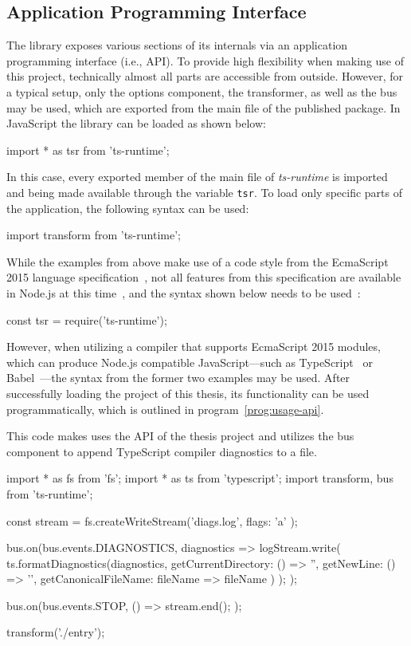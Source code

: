\subsection{Application Programming Interface}
\label{sec:usage-api}

The library exposes various sections of its internals via an application programming interface (i.e., API). To provide high flexibility when making use of this project, technically almost all parts are accessible from outside. However, for a typical setup, only the options component, the transformer, as well as the bus may be used, which are exported from the main file of the published package. In JavaScript the library can be loaded as shown below:
\begin{JsCode}[numbers=none]
import * as tsr from 'ts-runtime';
\end{JsCode}
In this case, every exported member of the main file of \emph{ts-runtime} is imported and being made available through the variable \texttt{tsr}. To load only specific parts of the application, the following syntax can be used:
\begin{JsCode}[numbers=none]
import { transform } from 'ts-runtime';
\end{JsCode}
While the examples from above make use of a code style from the EcmaScript 2015 language specification~\cite[p.~302]{ES6Spec:Ecma:2015}, not all features from this specification are available in Node.js at this time~\cite{Node:Docs:ES6}, and the syntax shown below needs to be used~\cite{Node:API:Modules}:
\begin{JsCode}[numbers=none]
const tsr = require('ts-runtime');
\end{JsCode}
However, when utilizing a compiler that supports EcmaScript 2015 modules, which can produce Node.js compatible JavaScript---such as TypeScript~\cite{TypeScriptHandbook:Modules} or Babel~\cite{Babel:Plugins}---the syntax from the former two examples may be used. After successfully loading the project of this thesis, its functionality can be used programmatically, which is outlined in program~\ref{prog:usage-api}.
\begin{program}
\caption{This code makes uses the API of the thesis project and utilizes the bus component to append TypeScript compiler diagnostics to a file.}
\label{prog:usage-api}
\begin{JsCode}
import * as fs from 'fs';
import * as ts from 'typescript';
import { transform, bus } from 'ts-runtime';

const stream = fs.createWriteStream('diags.log', { flags: 'a' });

bus.on(bus.events.DIAGNOSTICS, diagnostics => {
  logStream.write(
    ts.formatDiagnostics(diagnostics, {
      getCurrentDirectory: () => '',
      getNewLine: () => '\n',
      getCanonicalFileName: fileName => fileName
    })
  );
});

bus.on(bus.events.STOP, () => {
  stream.end();
});

transform('./entry');
\end{JsCode}
\end{program}

